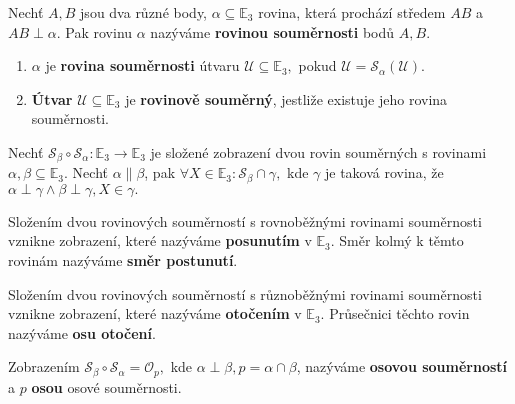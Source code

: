 \begin{definition}
    Nechť $A,B$ jsou dva různé body, $\alpha \subseteq \mathbb E_3$ rovina, která
    prochází středem $AB$ a $AB\perp \alpha$. Pak rovinu $\alpha$ nazýváme
    \textbf{rovinou souměrnosti} bodů $A,B.$
\end{definition}

\begin{definition}
\begin{enumerate}[$i.$]
\item $\alpha$ je \textbf{rovina souměrnosti} útvaru $\mathscr U\subseteq \mathbb E_3,$
pokud $\mathscr U = \mathscr S_\alpha(\mathscr U).$
\item \textbf{Útvar} $\mathscr U \subseteq \mathbb E_3$ je \textbf{rovinově souměrný},
jestliže existuje jeho rovina souměrnosti.
\end{enumerate}
\end{definition}

\begin{veta}
    Nechť $\mathscr S_\beta \circ \mathscr S_\alpha: \mathbb E_3 \to \mathbb E_3$ je
    složené zobrazení dvou rovin souměrných s rovinami $\alpha, \beta\subseteq \mathbb
    E_3$. Nechť $\alpha \parallel \beta$, pak $\forall X\in \mathbb E_3: \mathscr
    S_\beta \cap \gamma,$ kde $\gamma$ je taková rovina, že $\alpha \perp \gamma \land
    \beta \perp \gamma, X \in \gamma.$
\end{veta}

\begin{definition}
    Složením dvou rovinových souměrností s rovnoběžnými rovinami souměrnosti vznikne
    zobrazení, které nazýváme \textbf{posunutím} v $\mathbb E_3.$ Směr kolmý k těmto
    rovinám nazýváme \textbf{směr postunutí}.
\end{definition}

\begin{definition}
    Složením dvou rovinových souměrností s různoběžnými rovinami souměrnosti vznikne
    zobrazení, které nazýváme \textbf{otočením} v $\mathbb E_3.$ Průsečnici těchto
    rovin nazýváme \textbf{osu otočení}.
\end{definition}

\begin{definition}
    Zobrazením $\mathscr S_\beta \circ \mathscr S_\alpha = \mathscr O_p,$ kde
    $\alpha \perp \beta, p=\alpha \cap \beta$, nazýváme \textbf{osovou souměrností}
    a $p$ \textbf{osou} osové souměrnosti.
\end{definition}

